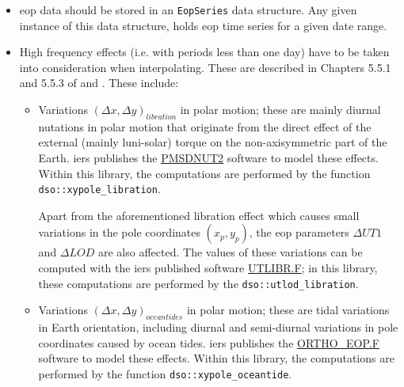\begin{itemize}
  \item \gls{eop} data should be stored in an \texttt{EopSeries} data structure. 
    Any given instance of this data structure, holds \gls{eop} time series for 
    a given date range.
  \item High frequency effects (i.e. with periods less than one day) have to be 
    taken into consideration when interpolating. These are described in Chapters 
    5.5.1 and 5.5.3 of \cite{iers2010} and \cite{Bradley2016}. These include:
    
    \begin{itemize}
      \item Variations $(\Delta x, \Delta y)_{libration}$ in polar motion; these are 
        mainly diurnal nutations in polar motion that originate from the direct 
        effect of the external (mainly luni-solar) torque on the non-axisymmetric 
        part of the Earth. \gls{iers} publishes the 
        \href{https://iers-conventions.obspm.fr/content/chapter5/software/PMSDNUT2.F}{PMSDNUT2} 
        software to model these effects. Within this library, the computations are 
        performed by the function \lstinline{dso::xypole_libration}.

        Apart from the aforementioned libration effect which causes small variations 
        in the pole coordinates $(x_p , y_p)$, the \gls{eop} parameters 
        $\Delta UT1$ and $\Delta LOD$ are also affected. The values of these 
        variations can be computed with the \gls{iers} published software 
        \href{https://iers-conventions.obspm.fr/content/chapter5/software/UTLIBR.F}{UTLIBR.F}; 
        in this library, these computations are performed by the \lstinline{dso::utlod_libration}.

      \item Variations $(\Delta x, \Delta y)_{ocean tides}$ in polar motion; these 
        are tidal variations in Earth orientation, including diurnal and semi-diurnal 
        variations in pole coordinates caused by ocean tides. \gls{iers} publishes the 
        \href{https://iers-conventions.obspm.fr/content/chapter8/software/ORTHO_EOP.F}{ORTHO_EOP.F} 
        software to model these effects. Within this library, the computations are 
        performed by the function \lstinline{dso::xypole_oceantide}.

    \end{itemize}

\end{itemize}
